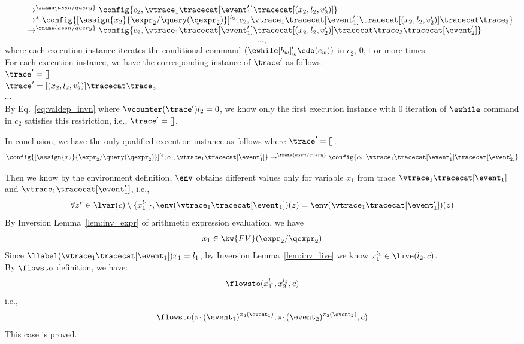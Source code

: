 \begin{subproof}
\begin{subproof}[Subproof]
\begin{enumerate}
\[\begin{array}{l}
  \\ \qquad
  \rightarrow^\rname{assn/query} 
  \config{{c}_2,  \vtrace_1 \tracecat [\event_1']\tracecat [(x_2, l_2,  v_2')]} 
  \\ \qquad
  \rightarrow^{*} 
  \config{[\assign{{x}_2}{\expr_2 / \query(\qexpr_2)}]^{l_2} ; {c}_2, 
  \vtrace_1 \tracecat [\event_1']\tracecat [(x_2, l_2,  v_2')] \tracecat \trace_3} 
  \\ \qquad
  \rightarrow^\rname{assn/query} 
  \config{{c}_2,  \vtrace_1 \tracecat [\event_1']\tracecat [(x_2, l_2,  v_2')] \tracecat \trace_3 \tracecat [\event_2']} 
 \end{array}
 \]
\[
  \ldots,
\] 
where each execution instance iterates the conditional command 
$(\ewhile [b_w]^l_w \edo (c_w))$ in $c_2$, $0, 1$ or more times.
%
\\
%
For each execution instance, we have the corresponding instance of $\trace'$ as follows:
\\
$\trace'  = [] $
\\
$\trace' = [(x_2, l_2,  v_2')] \tracecat \trace_3 $
%
\\
$\cdots$
%
\\
%
By Eq.~\ref{eq:valdep_invn} where $\vcounter(\trace') l_2 = 0$,
%
we know only the first execution instance with 0 iteration of $\ewhile$ command in $c_2$ satisfies this restriction, 
i.e., $\trace' = []$.
%
\end{enumerate}
In conclusion, we have the only qualified execution instance as follows where $\trace' = []$.
  \[
    \config{[\assign{{x}_2}{\expr_2 / \query(\qexpr_2)}]^{l_2} ; {c}_2, \vtrace_1 \tracecat [\event_1']} 
    \rightarrow^\rname{assn/query} 
    \config{{c}_2,  \vtrace_1 \tracecat [\event_1']\tracecat [\event_2']} 
 \]
\end{subproof}
%
Then we know by the environment definition,
$\env$ obtains different values only for variable $x_1$ 
from trace $\vtrace_1 \tracecat [\event_1]$ and 
$\vtrace_1 \tracecat [\event_1']$, i.e.,
\[
  \forall z^r \in \lvar(c) \setminus \{x_1^{l_1}\} ,
  \env(\vtrace_1 \tracecat [\event_1]) (z) =  
  \env(\vtrace_1 \tracecat [\event_1']) (z)
\]
%
By {Inversion Lemma~\ref{lem:inv_expr}} of arithmetic expression evaluation, we have
\[
  x_1 \in  \kw{FV}(\expr_2 / \qexpr_2) 
\]
Since $\llabel(\vtrace_1 \tracecat [\event_1]) x_1 = l_1$, 
by Inversion Lemma~\ref{lem:inv_live} we know $x_1^{l_1} \in \live(l_2, c)$.
%
\\
%
By $\flowsto$ definition, we have:
%
\[
\flowsto(x_1^{l_1}, {x}_2^{l_2}, c)
\]
i.e.,
%
\[
\flowsto(\pi_1(\event_1)^{\pi_2(\event_1)}, \pi_1(\event_2)^{\pi_2(\event_2)}, c)
 \]
%
This case is proved.
\end{subproof}